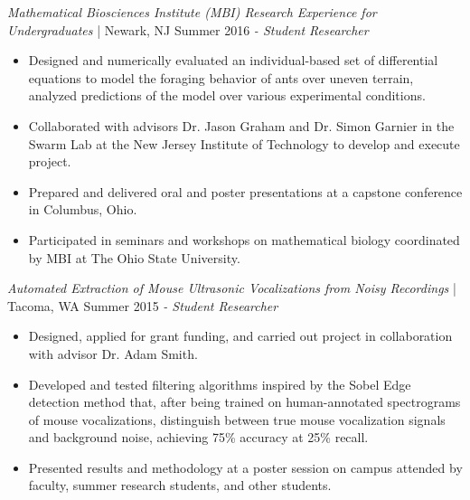 \textit{Mathematical Biosciences Institute (MBI) Research Experience for Undergraduates} | Newark, NJ \hfill Summer 2016 \newline
\textit{- Student Researcher} \\
  \vspace{-4.5mm}
 \begin{itemize}
 \item Designed and numerically evaluated an individual-based set of differential equations to model the foraging behavior of ants over uneven terrain, analyzed predictions of the model over various experimental conditions.
  \item Collaborated with advisors Dr. Jason Graham and Dr. Simon Garnier in the Swarm Lab at the New Jersey Institute of Technology to develop and execute project.
 \item Prepared and delivered oral and poster presentations at a capstone conference in Columbus, Ohio.
 \item Participated in seminars and workshops on mathematical biology coordinated by MBI at The Ohio State University.
 \end{itemize}
  \vspace{-3.5mm}

\textit{Automated Extraction of Mouse Ultrasonic Vocalizations from Noisy Recordings} | Tacoma, WA \hfill Summer 2015 \newline
\textit{- Student Researcher} \\
  \vspace{-4.5mm}
 \begin{itemize}
 \item Designed, applied for grant funding, and carried out project in collaboration with advisor Dr. Adam Smith.
 \item Developed and tested filtering algorithms inspired by the Sobel Edge detection method that, after being trained on human-annotated spectrograms of mouse vocalizations, distinguish between true mouse vocalization signals and background noise, achieving 75\% accuracy at 25\% recall.
 \item Presented results and methodology at a poster session on campus attended by faculty, summer research students, and other students.
 \end{itemize}
  \vspace{-3.5mm}
  
